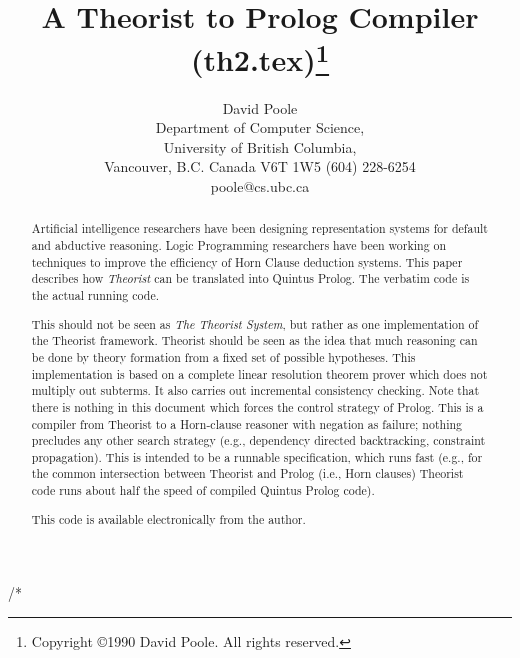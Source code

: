
/* 
\pagestyle{myheadings}
\makeindex
\newtheorem{example}{Example}
\newtheorem{algorithm}{Algorithm}
\newtheorem{theorem}{Theorem}
\newtheorem{lemma}[theorem]{Lemma}
\newtheorem{definition}{Definition}
\newtheorem{corollary}[theorem]{Corollary}
\newenvironment{proof}{\begin{quote} {\bf Proof: }}{$\Box$\end{quote}}
\newenvironment{prolog}{\begin{tabbing} \hbox{2cm}\=\hbox{1cm}\=\kill
    }{\end{tabbing}}
\newcommand{\IF}{\ $:-$\\\>}
\newcommand{\AND}{,\\\>}
\title{A Theorist to Prolog Compiler (th2.tex)\thanks{Copyright \copyright 1990
David Poole. All rights reserved.}}
\author{David Poole\\
Department of Computer Science,\\
University of British Columbia,\\
Vancouver, B.C. Canada V6T 1W5
(604) 228-6254\\
poole@cs.ubc.ca}

\maketitle
\begin{abstract}
Artificial intelligence researchers have been designing representation
systems for default and abductive reasoning.
Logic Programming researchers have been working on techniques to improve
the efficiency of Horn Clause deduction systems.
This paper describes how {\em Theorist\/} can be
translated into Quintus Prolog.
The verbatim code is the actual running code.

This should not be seen as {\em The Theorist System}, but rather
as one implementation of the Theorist framework. Theorist should be
seen as the idea that much reasoning can be done by theory formation
from a fixed set of possible hypotheses.
This implementation is based on a complete linear resolution theorem prover
which does not multiply out subterms. It also carries out incremental
consistency checking.
Note that there is nothing in this document which forces the control strategy
of Prolog. This is a compiler from Theorist to a Horn-clause reasoner
with negation as failure; nothing precludes any other search strategy
(e.g., dependency directed backtracking, constraint propagation).
This is intended to be a runnable specification, which runs fast
(e.g., for the common intersection between Theorist and Prolog (i.e., Horn
clauses) Theorist code runs about half the speed of compiled Quintus
Prolog code).

This code is available electronically from the author.
\end{abstract}
\tableofcontents

